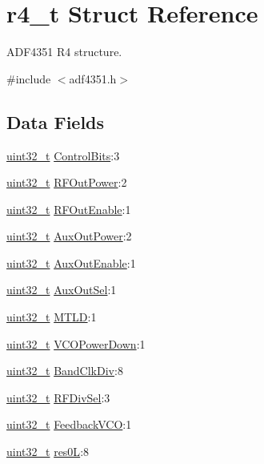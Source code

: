 \hypertarget{structr4__t}{}\section{r4\+\_\+t Struct Reference}
\label{structr4__t}


A\+D\+F4351 R4 structure.  




{\ttfamily \#include $<$adf4351.\+h$>$}

\subsection*{Data Fields}
\begin{DoxyCompactItemize}
\item 
\hyperlink{send_8c_a435d1572bf3f880d55459d9805097f62}{uint32\+\_\+t} \hyperlink{structr4__t_a9f03fbb2e74ac5c97c73cd70755d95eb}{Control\+Bits}\+:3
\item 
\hyperlink{send_8c_a435d1572bf3f880d55459d9805097f62}{uint32\+\_\+t} \hyperlink{structr4__t_ade4ee7f86064dd89515558dc5aa138bd}{R\+F\+Out\+Power}\+:2
\item 
\hyperlink{send_8c_a435d1572bf3f880d55459d9805097f62}{uint32\+\_\+t} \hyperlink{structr4__t_adf8eb2db5ffd584ec6c5b5496a90f0f5}{R\+F\+Out\+Enable}\+:1
\item 
\hyperlink{send_8c_a435d1572bf3f880d55459d9805097f62}{uint32\+\_\+t} \hyperlink{structr4__t_a92b00824868c7911a73217cbdd48ca96}{Aux\+Out\+Power}\+:2
\item 
\hyperlink{send_8c_a435d1572bf3f880d55459d9805097f62}{uint32\+\_\+t} \hyperlink{structr4__t_ab6c43ed3da1189c3de8cf2cafafb03f3}{Aux\+Out\+Enable}\+:1
\item 
\hyperlink{send_8c_a435d1572bf3f880d55459d9805097f62}{uint32\+\_\+t} \hyperlink{structr4__t_af75cec4d15f4f2e086db3be6d4c3c215}{Aux\+Out\+Sel}\+:1
\item 
\hyperlink{send_8c_a435d1572bf3f880d55459d9805097f62}{uint32\+\_\+t} \hyperlink{structr4__t_a899217c98d1c1eca8780186c8e44470c}{M\+T\+LD}\+:1
\item 
\hyperlink{send_8c_a435d1572bf3f880d55459d9805097f62}{uint32\+\_\+t} \hyperlink{structr4__t_a144b348686f74ef9a401f2c57f324824}{V\+C\+O\+Power\+Down}\+:1
\item 
\hyperlink{send_8c_a435d1572bf3f880d55459d9805097f62}{uint32\+\_\+t} \hyperlink{structr4__t_af9bbf20145437bb5913e815a71cc3eb5}{Band\+Clk\+Div}\+:8
\item 
\hyperlink{send_8c_a435d1572bf3f880d55459d9805097f62}{uint32\+\_\+t} \hyperlink{structr4__t_a6f0ef612a55877310aa2f07c9737e66b}{R\+F\+Div\+Sel}\+:3
\item 
\hyperlink{send_8c_a435d1572bf3f880d55459d9805097f62}{uint32\+\_\+t} \hyperlink{structr4__t_af070024e13538726836fc1c405aa0124}{Feedback\+V\+CO}\+:1
\item 
\hyperlink{send_8c_a435d1572bf3f880d55459d9805097f62}{uint32\+\_\+t} \hyperlink{structr4__t_a39447a9d51f096493dfc6d4a38bf3f9e}{res0L}\+:8
\end{DoxyCompactItemize}


